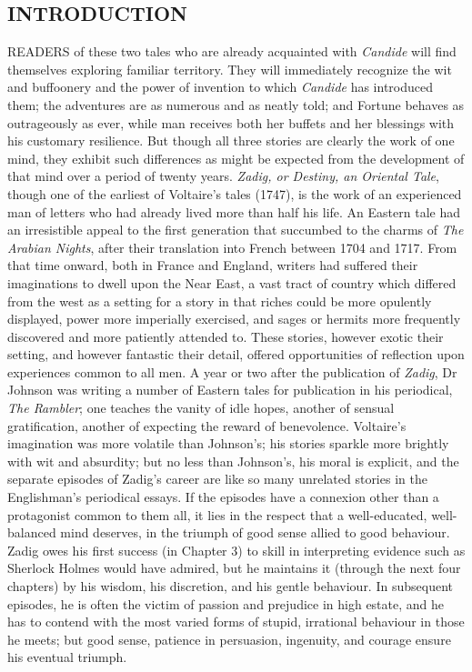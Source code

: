 \documentclass{article}
\begin{document}
\begin{center}
\section*{\textbf{INTRODUCTION }}

READERS of these two tales who are already acquainted with \textit{Candide} will 
find themselves exploring familiar territory. They will immediately recognize the 
wit and buffoonery and the power of invention to which \textit{Candide }has introduced 
them; the adventures are as numerous and as neatly told; and Fortune behaves as 
outrageously as ever, while man receives both her buffets and her blessings with 
his customary resilience. But though all three stories are clearly the work of 
one mind, they exhibit such differences as might be expected from the development 
of that mind over a period of twenty years. \textit{Zadig, or Destiny, an Oriental 
Tale}, though one of the earliest of Voltaire's tales (1747), is the work of an 
experienced man of letters who had already lived more than half his life. An Eastern 
tale had an irresistible appeal to the first generation that succumbed to the charms 
of \textit{The Arabian Nights}, after their translation into French between 1704 
and 1717. From that time onward, both in France and England, writers had suffered 
their imaginations to dwell upon the Near East, a vast tract of country which differed 
from the west as a setting for a story in that riches could be more opulently displayed, 
power more imperially exercised, and sages or hermits more frequently discovered 
and more patiently attended to. These stories, however exotic their setting, and 
however fantastic their detail, offered opportunities of reflection upon experiences 
common to all men. A year or two after the publication of\textit{ Zadig}, Dr Johnson 
was writing a number of Eastern tales for publication in his periodical, \textit{The 
Rambler}; one teaches the vanity of idle hopes, another of sensual gratification, 
another of expecting the reward of benevolence. Voltaire's imagination was more 
volatile than Johnson's; his stories sparkle more brightly with wit and absurdity; 
but no less than Johnson's, his moral is explicit, and the separate episodes of 
Zadig's career are like so many unrelated stories in the Englishman's periodical 
essays. If the episodes have a connexion other than a protagonist common to them 
all, it lies in the respect that a well-educated, well-balanced mind deserves, 
in the triumph of good sense allied to good behaviour. Zadig owes his first success 
(in Chapter 3) to skill in interpreting evidence such as Sherlock Holmes would 
have admired, but he maintains it (through the next four chapters) by his wisdom, 
his discretion, and his gentle behaviour. In subsequent episodes, he is often the 
victim of passion and prejudice in high estate, and he has to contend with the 
most varied forms of stupid, irrational behaviour in those he meets; but good sense, 
patience in persuasion, ingenuity, and courage ensure his eventual triumph. 


\end{center}
\end{document}
